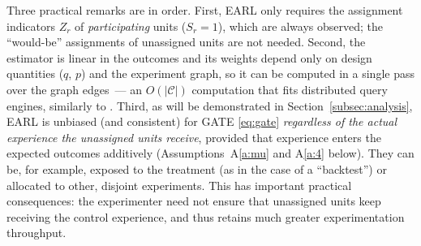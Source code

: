 \documentclass[sigconf]{acmart}
\begin{document}
Three practical remarks are in order. First, EARL only requires the assignment indicators $Z_r$ of \emph{participating} units ($S_r=1$), which are always observed; the ``would-be'' assignments of unassigned units are not needed. Second, the estimator is linear in the outcomes and its weights depend only on design quantities ($q$, $p$) and the experiment graph, so it can be computed in a single pass over the graph edges~--- an $O(|\mathcal C|)$ computation that fits distributed query engines, similarly to \cite{shi2025scalableanalysisbipartiteexperiments}. Third, as will be demonstrated in Section~\ref{subsec:analysis}, EARL is unbiased (and consistent) for GATE \eqref{eq:gate} \emph{regardless of the actual experience the unassigned units receive}, provided that experience enters the expected outcomes additively (Assumptions~A\ref{a:mu} and A\ref{a:4} below). They can be, for example, exposed to the treatment (as in the case of a ``backtest'') or allocated to other, disjoint experiments. This has important practical consequences: the experimenter need not ensure that unassigned units keep receiving the control experience, and thus retains much greater experimentation throughput.
\end{document}

